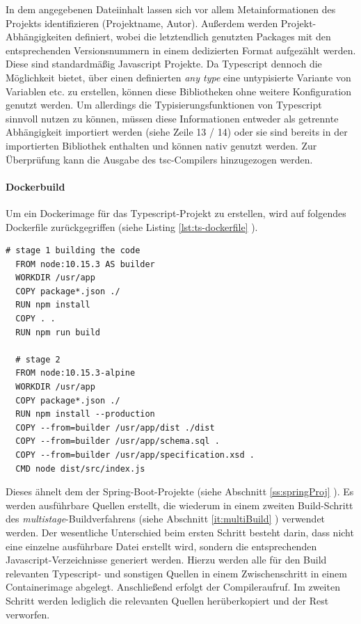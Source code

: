In dem angegebenen Dateiinhalt lassen sich vor allem Metainformationen des Projekts identifizieren (Projektname, Autor). Außerdem werden Projekt-Abhängigkeiten definiert, wobei die letztendlich genutzten Packages mit den entsprechenden Versionsnummern in einem dedizierten Format aufgezählt werden. Diese sind standardmäßig Javascript Projekte. Da Typescript dennoch die Möglichkeit bietet, über einen definierten \emph{any type} eine untypisierte Variante von Variablen etc. zu erstellen, können diese Bibliotheken ohne weitere Konfiguration genutzt werden. Um allerdings die Typisierungsfunktionen von Typescript sinnvoll nutzen zu können, müssen diese Informationen entweder als getrennte Abhängigkeit importiert werden (siehe Zeile 13 / 14) oder sie sind bereits in der importierten Bibliothek enthalten und können nativ genutzt werden. Zur Überprüfung kann die Ausgabe des tsc-Compilers hinzugezogen werden.

\paragraph{Dockerbuild}
Um ein Dockerimage für das Typescript-Projekt zu erstellen, wird auf folgendes Dockerfile zurückgegriffen (siehe Listing \ref{lst:ts-dockerfile} ).

\newpage

\begin{lstlisting}[style=bashStyle,caption={Dockerfile - Typescript Projekt},label=lst:ts-dockerfile]
  # stage 1 building the code
  FROM node:10.15.3 AS builder
  WORKDIR /usr/app
  COPY package*.json ./
  RUN npm install
  COPY . .
  RUN npm run build 

  # stage 2
  FROM node:10.15.3-alpine
  WORKDIR /usr/app
  COPY package*.json ./
  RUN npm install --production
  COPY --from=builder /usr/app/dist ./dist
  COPY --from=builder /usr/app/schema.sql .
  COPY --from=builder /usr/app/specification.xsd .
  CMD node dist/src/index.js
\end{lstlisting}

Dieses ähnelt dem der Spring-Boot-Projekte (siehe Abschnitt \ref{ss:springProj} ). Es werden ausführbare Quellen erstellt, die wiederum in einem zweiten Build-Schritt des \emph{multistage}-Buildverfahrens (siehe Abschnitt \ref{it:multiBuild} ) verwendet werden. Der wesentliche Unterschied beim ersten Schritt besteht darin, dass nicht eine einzelne ausführbare Datei erstellt wird, sondern die entsprechenden Javascript-Verzeichnisse generiert werden. Hierzu werden alle für den Build relevanten Typescript- und sonstigen Quellen in einem Zwischenschritt in einem Containerimage abgelegt. Anschließend erfolgt der Compileraufruf. Im zweiten Schritt werden lediglich die relevanten Quellen herüberkopiert und der Rest verworfen. 


